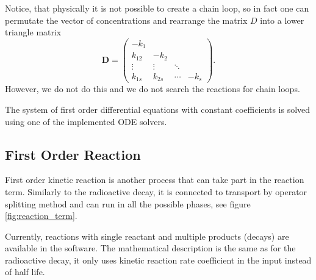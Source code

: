 Notice, that physically it is not possible to create a chain loop, so in fact one can permutate the vector of 
concentrations and rearrange the matrix $D$ into a lower triangle matrix
\[
\mathbf{D} = \begin{pmatrix} -k_1 &  &  &  \\ 
                  k_{12} & -k_2 & &  \\
                  \vdots &\vdots& \ddots &  \\
                  k_{1s} &k_{2s}& \cdots & -k_s \end{pmatrix}.
\]
However, we do not do this and we do not search the reactions for chain loops.

The system of first order differential equations with constant coefficients is solved using one of the
implemented ODE solvers.


\subsection{First Order Reaction}
\label{sec:first_order_reaction}
First order kinetic reaction is another process that can take part in the reaction term. Similarly to the
radioactive decay, it is connected to transport by operator splitting method and can run in all the possible
phases, see figure \ref{fig:reaction_term}.

Currently, reactions with single reactant and multiple products (decays) are available in the software.
The mathematical description is the same as for the radioactive decay, it only uses kinetic reaction rate
coefficient  in the input instead of half life.








